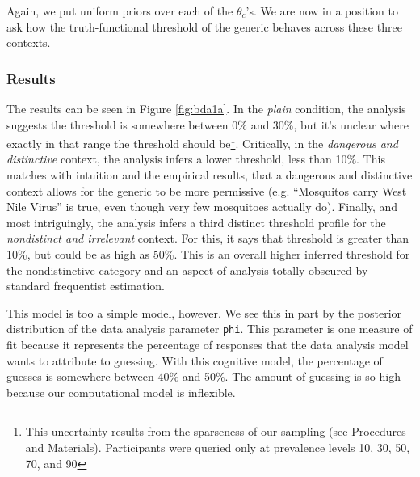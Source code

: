 \documentclass[10pt,letterpaper]{article}
\begin{document}
Again, we put uniform priors over each of the $\theta_{c}$'s. We are now in a position to ask how the truth-functional threshold of the generic behaves across these three contexts. 

\subsubsection{Results}

The results can be seen in Figure \ref{fig:bda1a}. In the \emph{plain} condition, the analysis suggests the threshold is somewhere between 0\% and 30\%, but it's unclear where exactly in that range the threshold should be\footnote{This uncertainty results from the sparseness of our sampling (see Procedures and Materials). Participants were queried only at prevalence levels 10, 30, 50, 70, and 90}. Critically, in the \emph{dangerous and distinctive} context, the analysis infers a lower threshold, less than 10\%. This matches with intuition and the empirical results, that a dangerous and distinctive context allows for the generic to be more permissive (e.g. ``Mosquitos carry West Nile Virus'' is true, even though very few mosquitoes actually do). Finally, and most intriguingly, the analysis infers a third distinct threshold profile for the \emph{nondistinct and irrelevant} context.  For this, it says that threshold is greater than 10\%, but could be as high as 50\%. This is an overall higher inferred threshold for the nondistinctive category and an aspect of analysis totally obscured by standard frequentist estimation. 

This model is too a simple model, however. We see this in part by the posterior distribution of the data analysis parameter \lstinline{phi}. This parameter is one measure of fit because it represents the percentage of responses that the data analysis model wants to attribute to guessing. With this cognitive model, the percentage of guesses is somewhere between 40\% and 50\%. The amount of guessing is so high because our computational model is inflexible.
\end{document}
